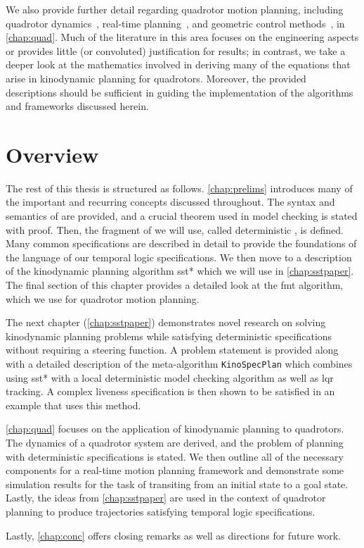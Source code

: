We also provide further detail regarding quadrotor motion planning, including quadrotor dynamics~\cite{Mellinger2011}, real-time planning~\cite{Allen2016}, and geometric control methods~\cite{Lee2010}, in \autoref{chap:quad}. Much of the literature in this area focuses on the engineering aspects or provides little (or convoluted) justification for results; in contrast, we take a deeper look at the mathematics involved in deriving many of the equations that arise in kinodynamic planning for quadrotors. Moreover, the provided descriptions should be sufficient in guiding the implementation of the algorithms and frameworks discussed herein.


\section{Overview}

The rest of this thesis is structured as follows. \autoref{chap:prelims} introduces many of the important and recurring concepts discussed throughout. The syntax and semantics of \mucalc{} are provided, and a crucial theorem used in model checking is stated with proof. Then, the fragment of \mucalc{} we will use, called deterministic \mucalc{}, is defined. Many common specifications are described in detail to provide the foundations of the language of our temporal logic specifications. We then move to a description of the kinodynamic planning algorithm \gls{sst}* which we will use in \autoref{chap:sstpaper}. The final section of this chapter provides a detailed look at the \gls{fmt} algorithm, which we use for quadrotor motion planning.

The next chapter (\autoref{chap:sstpaper}) demonstrates novel research on solving kinodynamic planning problems while satisfying deterministic \mucalc{} specifications without requiring a steering function. A problem statement is provided along with a detailed description of the meta-algorithm \texttt{KinoSpecPlan} which combines using \gls{sst}* with a local deterministic model checking algorithm as well as \gls{lqr} tracking. A complex liveness specification is then shown to be satisfied in an example that uses this method.

\autoref{chap:quad} focuses on the application of kinodynamic planning to quadrotors. The dynamics of a quadrotor system are derived, and the problem of planning with deterministic \mucalc{} specifications is stated. We then outline all of the necessary components for a real-time motion planning framework and demonstrate some simulation results for the task of transiting from an initial state to a goal state. Lastly, the ideas from \autoref{chap:sstpaper} are used in the context of quadrotor planning to produce trajectories satisfying temporal logic specifications.

Lastly, \autoref{chap:conc} offers closing remarks as well as directions for future work.
